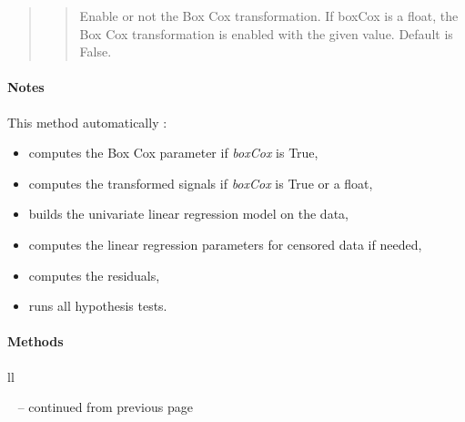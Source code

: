 \documentclass[letterpaper,10pt,english]{sphinxmanual}
\begin{document}
\begin{fulllineitems}
\begin{quote}
\begin{description}
\begin{quote}
Enable or not the Box Cox transformation. If boxCox is a float, the Box
Cox transformation is enabled with the given value. Default is False.
\end{quote}

\end{description}\end{quote}
\paragraph{Notes}

This method automatically :
\begin{itemize}
\item {} 
computes the Box Cox parameter if \emph{boxCox} is True,

\item {} 
computes the transformed signals if \emph{boxCox} is True or a float,

\item {} 
builds the univariate linear regression model on the data,

\item {} 
computes the linear regression parameters for censored data if needed,

\item {} 
computes the residuals,

\item {} 
runs all hypothesis tests.

\end{itemize}
\paragraph{Methods}

\begin{longtable}{ll}
\hline
\endfirsthead

%
{{\textsf{\tablename\ \thetable{} -- continued from previous page}}} \\
\hline
\endhead

\hline {} \\ \hline
\endfoot

\endlastfoot



\end{longtable}
\end{fulllineitems}
\end{document}
